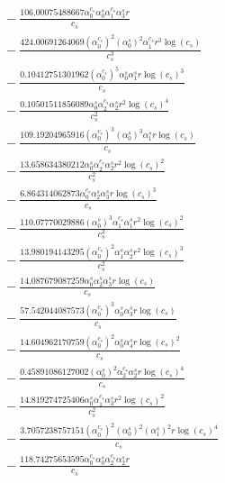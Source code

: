\documentclass[10pt]{article}
\begin{document}
\begin{align*}
&{}  - \frac{106.00075488667 \alpha_{0}^{c_s} \alpha_{0}^s \alpha_{1}^{c_s} \alpha_{3}^s r}{c_{s}} \\
&{}  - \frac{424.00691264069 \left(\alpha_{0}^{c_s}\right)^{2} \left(\alpha_{0}^s\right)^{2} \alpha_{1}^{c_s} r^{3} \log{\left(c_{s} \right)}}{c_{s}^{3}} \\
&{}  - \frac{0.10412751301962 \left(\alpha_{0}^{c_s}\right)^{5} \alpha_{0}^s \alpha_{1}^s r \log{\left(c_{s} \right)}^{3}}{c_{s}} \\
&{}  - \frac{0.10501511856089 \alpha_{0}^s \alpha_{2}^{c_s} \alpha_{2}^s r^{2} \log{\left(c_{s} \right)}^{4}}{c_{s}^{2}} \\
&{}  - \frac{109.19204965916 \left(\alpha_{0}^{c_s}\right)^{3} \left(\alpha_{0}^s\right)^{3} \alpha_{1}^s r \log{\left(c_{s} \right)}}{c_{s}} \\
&{}  - \frac{13.658634380212 \alpha_{0}^s \alpha_{2}^{c_s} \alpha_{2}^s r^{2} \log{\left(c_{s} \right)}^{2}}{c_{s}^{2}} \\
&{}  - \frac{6.864314062873 \alpha_{0}^{c_s} \alpha_{2}^s \alpha_{3}^s r \log{\left(c_{s} \right)}^{3}}{c_{s}} \\
&{}  - \frac{110.07770029886 \left(\alpha_{0}^s\right)^{3} \alpha_{1}^{c_s} \alpha_{1}^s r^{2} \log{\left(c_{s} \right)}^{2}}{c_{s}^{2}} \\
&{}  - \frac{13.980194143295 \left(\alpha_{0}^{c_s}\right)^{2} \alpha_{1}^s \alpha_{2}^s r^{2} \log{\left(c_{s} \right)}^{3}}{c_{s}^{2}} \\
&{}  - \frac{14.087679087259 \alpha_{0}^s \alpha_{2}^s \alpha_{3}^s r \log{\left(c_{s} \right)}}{c_{s}} \\
&{}  - \frac{57.542044087573 \left(\alpha_{0}^{c_s}\right)^{3} \alpha_{0}^s \alpha_{3}^s r \log{\left(c_{s} \right)}}{c_{s}} \\
&{}  - \frac{14.604962170759 \left(\alpha_{0}^{c_s}\right)^{2} \alpha_{0}^s \alpha_{4}^s r \log{\left(c_{s} \right)}^{2}}{c_{s}} \\
&{}  - \frac{0.45891086127002 \left(\alpha_{0}^s\right)^{2} \alpha_{2}^{c_s} \alpha_{2}^s r \log{\left(c_{s} \right)}^{4}}{c_{s}} \\
&{}  - \frac{14.819274725406 \alpha_{0}^s \alpha_{1}^{c_s} \alpha_{3}^s r^{2} \log{\left(c_{s} \right)}^{2}}{c_{s}^{2}} \\
&{}  - \frac{3.7057238757151 \left(\alpha_{0}^{c_s}\right)^{2} \left(\alpha_{0}^s\right)^{2} \left(\alpha_{1}^s\right)^{2} r \log{\left(c_{s} \right)}^{4}}{c_{s}} \\
&{}  - \frac{118.74275653595 \alpha_{0}^{c_s} \alpha_{0}^s \alpha_{2}^{c_s} \alpha_{2}^s r}{c_{s}} \\

\end{align*}
\end{document}
